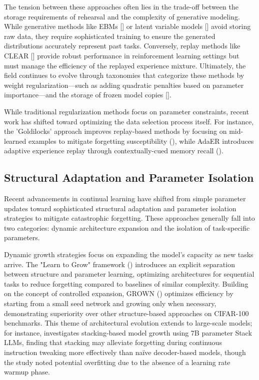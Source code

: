 \documentclass[11pt]{article}
\begin{document}
The tension between these approaches often lies in the trade-off between the storage requirements of rehearsal and the complexity of generative modeling. While generative methods like EBMs [\citep{1912.01238}] or latent variable models [\citep{1810.10612}] avoid storing raw data, they require sophisticated training to ensure the generated distributions accurately represent past tasks. Conversely, replay methods like CLEAR [\citep{1811.11682}] provide robust performance in reinforcement learning settings but must manage the efficiency of the replayed experience mixture. Ultimately, the field continues to evolve through taxonomies that categorize these methods by weight regularization—such as adding quadratic penalties based on parameter importance—and the storage of frozen model copies [\citep{2302.00487}].

While traditional regularization methods focus on parameter constraints, recent work has shifted toward optimizing the data selection process itself. For instance, the 'Goldilocks' approach improves replay-based methods by focusing on mid-learned examples to mitigate forgetting susceptibility (\citep{2406.09935}), while AdaER introduces adaptive experience replay through contextually-cued memory recall (\citep{2308.03810}).
\subsection{Structural Adaptation and Parameter Isolation}

Recent advancements in continual learning have shifted from simple parameter updates toward sophisticated structural adaptation and parameter isolation strategies to mitigate catastrophic forgetting. These approaches generally fall into two categories: dynamic architecture expansion and the isolation of task-specific parameters.

Dynamic growth strategies focus on expanding the model's capacity as new tasks arrive. The "Learn to Grow" framework (\citep{1904.00310}) introduces an explicit separation between structure and parameter learning, optimizing architectures for sequential tasks to reduce forgetting compared to baselines of similar complexity. Building on the concept of controlled expansion, GROWN (\citep{2110.00908}) optimizes efficiency by starting from a small seed network and growing only when necessary, demonstrating superiority over other structure-based approaches on CIFAR-100 benchmarks. This theme of architectural evolution extends to large-scale models; for instance, \citep{2509.01213} investigates stacking-based model growth using 7B parameter Stack LLMs, finding that stacking may alleviate forgetting during continuous instruction tweaking more effectively than naïve decoder-based models, though the study noted potential overfitting due to the absence of a learning rate warmup phase.
\end{document}
